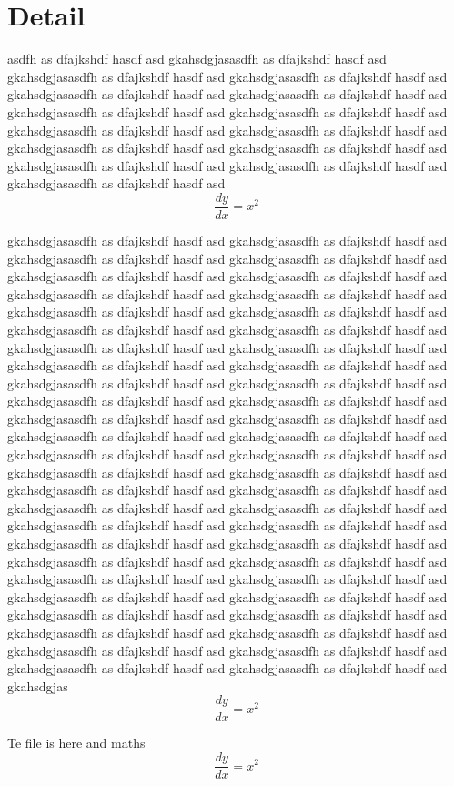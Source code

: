 \documentclass{book}
\begin{document}
\section{Detail}
asdfh as dfajkshdf hasdf asd gkahsdgjasasdfh as dfajkshdf hasdf asd gkahsdgjasasdfh as dfajkshdf hasdf asd gkahsdgjasasdfh as dfajkshdf hasdf asd gkahsdgjasasdfh as dfajkshdf hasdf asd gkahsdgjasasdfh as dfajkshdf hasdf asd gkahsdgjasasdfh as dfajkshdf hasdf asd gkahsdgjasasdfh as dfajkshdf hasdf asd gkahsdgjasasdfh as dfajkshdf hasdf asd gkahsdgjasasdfh as dfajkshdf hasdf asd gkahsdgjasasdfh as dfajkshdf hasdf asd gkahsdgjasasdfh as dfajkshdf hasdf asd gkahsdgjasasdfh as dfajkshdf hasdf asd gkahsdgjasasdfh as dfajkshdf hasdf asd gkahsdgjasasdfh as dfajkshdf hasdf asd
\begin{equation}
\frac{dy}{dx} = x^2
\end{equation}

 gkahsdgjasasdfh as dfajkshdf hasdf asd gkahsdgjasasdfh as dfajkshdf hasdf asd gkahsdgjasasdfh as dfajkshdf hasdf asd gkahsdgjasasdfh as dfajkshdf hasdf asd gkahsdgjasasdfh as dfajkshdf hasdf asd gkahsdgjasasdfh as dfajkshdf hasdf asd gkahsdgjasasdfh as dfajkshdf hasdf asd gkahsdgjasasdfh as dfajkshdf hasdf asd gkahsdgjasasdfh as dfajkshdf hasdf asd gkahsdgjasasdfh as dfajkshdf hasdf asd gkahsdgjasasdfh as dfajkshdf hasdf asd gkahsdgjasasdfh as dfajkshdf hasdf asd gkahsdgjasasdfh as dfajkshdf hasdf asd gkahsdgjasasdfh as dfajkshdf hasdf asd gkahsdgjasasdfh as dfajkshdf hasdf asd gkahsdgjasasdfh as dfajkshdf hasdf asd gkahsdgjasasdfh as dfajkshdf hasdf asd gkahsdgjasasdfh as dfajkshdf hasdf asd gkahsdgjasasdfh as dfajkshdf hasdf asd gkahsdgjasasdfh as dfajkshdf hasdf asd gkahsdgjasasdfh as dfajkshdf hasdf asd gkahsdgjasasdfh as dfajkshdf hasdf asd gkahsdgjasasdfh as dfajkshdf hasdf asd gkahsdgjasasdfh as dfajkshdf hasdf asd gkahsdgjasasdfh as dfajkshdf hasdf asd gkahsdgjasasdfh as dfajkshdf hasdf asd gkahsdgjasasdfh as dfajkshdf hasdf asd gkahsdgjasasdfh as dfajkshdf hasdf asd gkahsdgjasasdfh as dfajkshdf hasdf asd gkahsdgjasasdfh as dfajkshdf hasdf asd gkahsdgjasasdfh as dfajkshdf hasdf asd gkahsdgjasasdfh as dfajkshdf hasdf asd gkahsdgjasasdfh as dfajkshdf hasdf asd gkahsdgjasasdfh as dfajkshdf hasdf asd gkahsdgjasasdfh as dfajkshdf hasdf asd gkahsdgjasasdfh as dfajkshdf hasdf asd gkahsdgjasasdfh as dfajkshdf hasdf asd gkahsdgjasasdfh as dfajkshdf hasdf asd gkahsdgjasasdfh as dfajkshdf hasdf asd gkahsdgjasasdfh as dfajkshdf hasdf asd gkahsdgjasasdfh as dfajkshdf hasdf asd gkahsdgjasasdfh as dfajkshdf hasdf asd gkahsdgjasasdfh as dfajkshdf hasdf asd gkahsdgjasasdfh as dfajkshdf hasdf asd gkahsdgjasasdfh as dfajkshdf hasdf asd gkahsdgjasasdfh as dfajkshdf hasdf asd gkahsdgjasasdfh as dfajkshdf hasdf asd gkahsdgjasasdfh as dfajkshdf hasdf asd gkahsdgjasasdfh as dfajkshdf hasdf asd gkahsdgjasasdfh as dfajkshdf hasdf asd gkahsdgjas
\begin{equation}
\frac{dy}{dx} = x^2
\end{equation}

Te file is here
and  maths 
\[\frac{dy}{dx} = x^2\]
\end{document}
